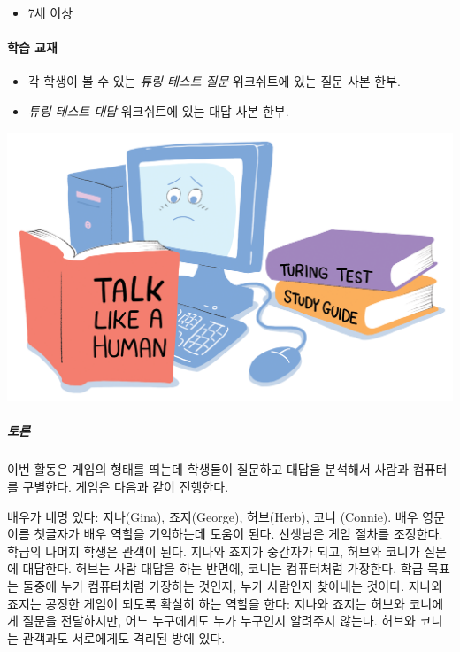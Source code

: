 \documentclass[]{article}
\begin{document}
\begin{itemize}
\itemsep1pt\parskip0pt
\item
  7세 이상
\end{itemize}

\mbox{}\paragraph{학습 교재}\label{section-273}

\begin{itemize}
\itemsep1pt\parskip0pt
\item
  각 학생이 볼 수 있는 \emph{튜링 테스트 질문} 위크쉬트에 있는 질문 사본
  한부.
\item
  \emph{튜링 테스트 대답} 워크쉬트에 있는 대답 사본 한부.
\end{itemize}


\includegraphics{csunplugged/06-part/img/ch21-turing/20-turing-01-conversation.png}

\subparagraph{토론}\label{section-274}

이번 활동은 게임의 형태를 띄는데 학생들이 질문하고 대답을 분석해서
사람과 컴퓨터를 구별한다. 게임은 다음과 같이 진행한다.

배우가 네명 있다: 지나(Gina), 죠지(George), 허브(Herb), 코니 (Connie).
배우 영문이름 첫글자가 배우 역할을 기억하는데 도움이 된다. 선생님은 게임
절차를 조정한다. 학급의 나머지 학생은 관객이 된다. 지나와 죠지가
중간자가 되고, 허브와 코니가 질문에 대답한다. 허브는 사람 대답을 하는
반면에, 코니는 컴퓨터처럼 가장한다. 학급 목표는 둘중에 누가 컴퓨터처럼
가장하는 것인지, 누가 사람인지 찾아내는 것이다. 지나와 죠지는 공정한
게임이 되도록 확실히 하는 역할을 한다: 지나와 죠지는 허브와 코니에게
질문을 전달하지만, 어느 누구에게도 누가 누구인지 알려주지 않는다. 허브와
코니는 관객과도 서로에게도 격리된 방에 있다.
\end{document}
